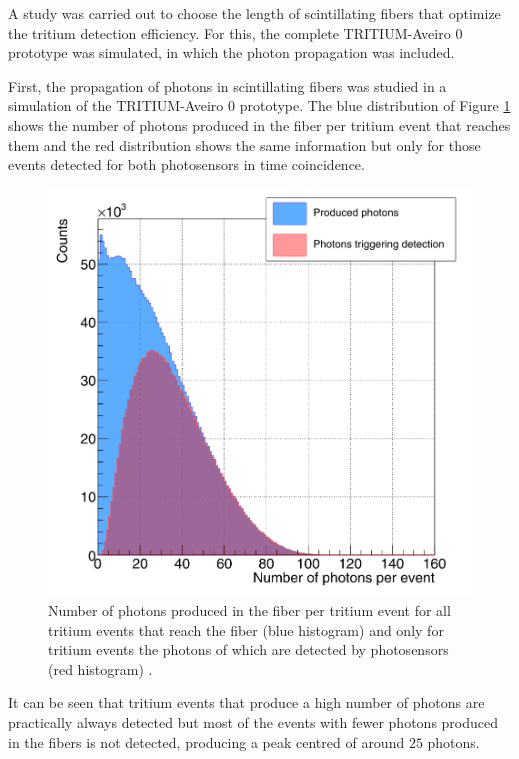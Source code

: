 A study was carried out to choose the length of scintillating fibers that optimize the tritium detection efficiency. For this, the complete TRITIUM-Aveiro 0 prototype was simulated, in which the photon propagation was included.

First, the propagation of photons in scintillating fibers was studied in a simulation of the TRITIUM-Aveiro 0 prototype. The blue distribution of Figure \ref{fig:PhotonsFibersYesNoPhotosensors} shows the number of photons produced in the fiber per tritium event that reaches them and the red distribution shows the same information but only for those events detected for both photosensors in time coincidence.

\begin{figure}[h]
\centering
\includegraphics[scale=0.3]{Figures/8SimulationsResults/81TRITIUMDesign/813Length/CollectionPhotonsInFibers.png}
\caption{Number of photons produced in the fiber per tritium event for all tritium events that reach the fiber (blue histogram) and only for tritium events the photons of which are detected by photosensors (red histogram) \cite{SimulationPaperCarlos}.\label{fig:PhotonsFibersYesNoPhotosensors}}
\end{figure}

It can be seen that tritium events that produce a high number of photons are practically always detected but most of the events with fewer photons produced in the fibers is not detected, producing a peak centred of around $25$ photons.  

